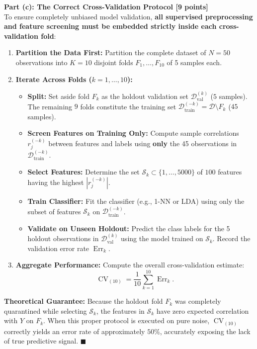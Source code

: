\documentclass[11pt,a4paper]{article}
\begin{document}
\vspace{4pt}
\textbf{Part (c): The Correct Cross-Validation Protocol [9 points]} \\
To ensure completely unbiased model validation, \textbf{all supervised preprocessing and feature screening must be embedded strictly inside each cross-validation fold}:
\begin{enumerate}[label=\arabic*., leftmargin=18pt, itemsep=3pt]
  \item \textbf{Partition the Data First:} Partition the complete dataset of $N=50$ observations into $K=10$ disjoint folds $F_1, \dots, F_{10}$ of 5 samples each.
  \item \textbf{Iterate Across Folds ($k = 1, \dots, 10$):}
  \begin{itemize}[itemsep=2pt, leftmargin=14pt]
    \item \textbf{Split:} Set aside fold $F_k$ as the holdout validation set $\mathcal{D}_{\text{val}}^{(k)}$ ($5$ samples). The remaining $9$ folds constitute the training set $\mathcal{D}_{\text{train}}^{(-k)} = \mathcal{D} \setminus F_k$ ($45$ samples).
    \item \textbf{Screen Features on Training Only:} Compute sample correlations $r_j^{(-k)}$ between features and labels using \textbf{only} the 45 observations in $\mathcal{D}_{\text{train}}^{(-k)}$.
    \item \textbf{Select Features:} Determine the set $\mathcal{S}_k \subset \{1, \dots, 5000\}$ of $100$ features having the highest $|r_j^{(-k)}|$.
    \item \textbf{Train Classifier:} Fit the classifier (e.g., 1-NN or LDA) using only the subset of features $\mathcal{S}_k$ on $\mathcal{D}_{\text{train}}^{(-k)}$.
    \item \textbf{Validate on Unseen Holdout:} Predict the class labels for the 5 holdout observations in $\mathcal{D}_{\text{val}}^{(k)}$ using the model trained on $\mathcal{S}_k$. Record the validation error rate $\operatorname{Err}_k$.
  \end{itemize}
  \item \textbf{Aggregate Performance:} Compute the overall cross-validation estimate:
  \[
    \operatorname{CV}_{(10)} = \frac{1}{10} \sum_{k=1}^{10} \operatorname{Err}_k.
  \]
\end{enumerate}
\textbf{Theoretical Guarantee:} Because the holdout fold $F_k$ was completely quarantined while selecting $\mathcal{S}_k$, the features in $\mathcal{S}_k$ have zero expected correlation with $Y$ on $F_k$. When this proper protocol is executed on pure noise, $\operatorname{CV}_{(10)}$ correctly yields an error rate of approximately $50\%$, accurately exposing the lack of true predictive signal. $\blacksquare$
\end{document}
